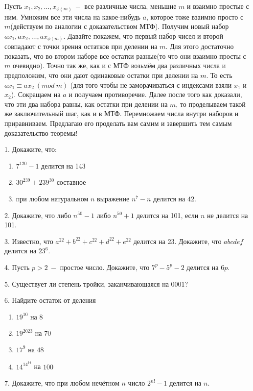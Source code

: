 Пусть $x_1, x_2, \dots, x_{\phi (m)} \ - $ все различные числа, меньшие $m$ и взаимно простые с ним. Умножим все эти числа на какое-нибудь $a$, которое тоже взаимно просто с $m$(действуем по аналогии с доказательством МТФ). Получим новый набор $ax_1, ax_2, \dots, ax_{\phi (m)}$. Давайте покажем, что первый набор чисел и второй совпадают с точки зрения остатков при делении на $m$. Для этого достаточно показать, что во втором наборе все остатки разные(то что они взаимно просты с $m$ очевидно). Точно так же, как и с МТФ возьмём два различных числа и предположим, что они дают одинаковые остатки при делении на $m$. То есть $ax_1 \equiv ax_2 \ (mod \ m)$ (для того чтобы не заморачиваться с индексами взяли $x_1$ и $x_2$). Сокращаем на $a$ и получаем противоречие. Далее после того как доказали, что эти два набора равны, как остатки при делении на $m$, то проделываем такой же заключительный шаг, как и в МТФ. Перемножаем числа внутри наборов и приравниваем. Предлагаю его  проделать вам самим и завершить тем самым доказательство теоремы!

\newpage

1. Докажите, что:
\begin{enumerate}
    \item $7^{120} - 1$ делится на 143
    \item $30^{239} + 239^{30}$ составное
    \item при любом натуральном $n$ выражение $n^{7} - n$ делится на $42$.
\end{enumerate}

2. Докажите, что либо $n^{50} - 1$ либо $n^{50} + 1$ делится на 101, если $n$ не делится на 101.
 
3. Известно, что $a^{22} + b^{22} + c^{22} + d^{22} + e^{22}$ делится на 23. Докажите, что $abcdef$ делится на $23^6$.

4. Пусть $p > 2 \ -$ простое число. Докажите, что $7^p - 5^p - 2$ делится на $6p$.  

5. Существует ли степень тройки, заканчивающаяся на 0001?

6. Найдите остаток от деления
\begin{enumerate}
    \item $19^{10}$ на $8$ 
    \item $19^{2023}$ на $70$
    \item $17^9$ на $48$
    \item $14^{14^{14}}$ на $100$
\end{enumerate}

7. Докажите, что при любом нечётном $n$ число  $2^{n!} - 1$  делится на $n$.